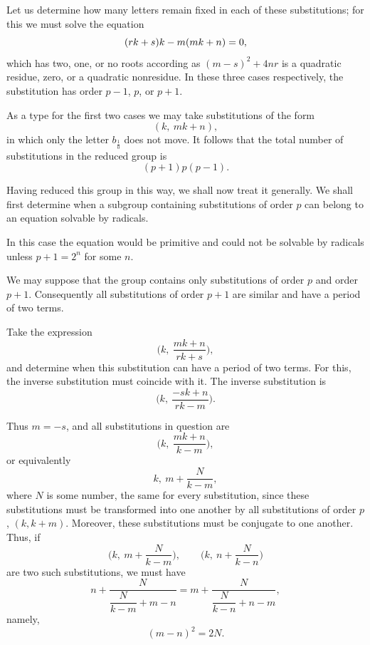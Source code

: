 Let us determine how many letters remain fixed in each of these substitutions;
for this we must solve the equation
\[
\GalPrintedError{(rk + s)k - m(mk + n) = 0}{W10-PE006},
\]
which has two, one, or no roots according as $(m-s)^{2}+4nr$ is a quadratic
residue, zero, or a quadratic nonresidue. In these three cases respectively,
the substitution has order $p-1$, $p$, or $p+1$.



As a type for the first two cases we may take substitutions of the form
\[
(k,\ mk + n),
\]
in which only the letter $b_{\frac{1}{0}}$ does not move. It follows that the
total number of substitutions in the reduced group is
\[
(p + 1)p(p - 1).
\]

Having reduced this group in this way, we shall now treat it generally. We
shall first determine when a subgroup containing substitutions of order $p$
can belong to an equation solvable by radicals.

In this case the equation would be primitive and could not be
solvable by radicals unless $p+1=2^{n}$ for some $n$.

We may suppose that the group contains only substitutions of order $p$ and
order $p+1$. Consequently all substitutions of order $p+1$ are similar and
have a period of two terms.

Take the expression
\[
\biggl(k,\ \frac{mk + n}{rk + s}\biggr),
\]
and determine when this substitution can have a period of two terms. For this,
the inverse substitution must coincide with it. The inverse substitution is
\[
\biggl(k,\ \frac{-sk + n}{rk - m}\biggr).
\]

Thus $m=-s$, and all substitutions in question are
\[
\biggl(k,\ \frac{mk + n}{k - m}\biggr),
\]
or equivalently
\[
k,\ m + \frac{N}{k - m},
\]
where $N$ is some number, the same for every substitution, since these
substitutions must be transformed into one another by all substitutions of
order $p$, $(k,k+m)$. Moreover, these substitutions must be conjugate to one
another. Thus, if
\[
\biggl(k,\ m + \frac{N}{k - m}\biggr), \qquad
\biggl(k,\ n + \frac{N}{k - n}\biggr)
\]
are two such substitutions, we must have
\[
n + \frac{N}{\dfrac{N}{k-m} + m - n} =
m + \frac{N}{\dfrac{N}{k-n} + n - m},
\]
namely,
\[
(m - n)^{2} = 2N.
\]

